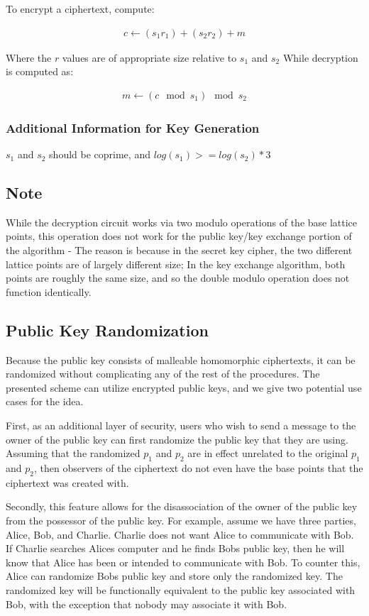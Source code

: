 \documentclass[preprint]{iacrtrans}
\begin{document}
To encrypt a ciphertext, compute:

\begin{align}
   c \gets (s_1 r_1) + (s_2 r_2) + m
\end{align}

Where the $r$ values are of appropriate size relative to $s_1$ and $s_2$ 
While decryption is computed as:

\begin{align}
    m \gets (c \mod s_1) \mod s_2
\end{align}

\subsubsection{Additional Information for Key Generation}
$s_1$ and $s_2$ should be coprime, and $log(s_1) >= log(s_2) * 3$

\subsection{Note}
While the decryption circuit works via two modulo operations of the base lattice points, this operation does not work for the public key/key exchange portion of the algorithm - The reason is because in the secret key cipher, the two different lattice points are of largely different size; In the key exchange algorithm, both points are roughly the same size, and so the double modulo operation does not function identically.

\subsection{Public Key Randomization}
Because the public key consists of malleable homomorphic ciphertexts, it can be randomized without complicating any of the rest of the procedures. The presented scheme can utilize encrypted public keys, and we give two potential use cases for the idea.

First, as an additional layer of security, users who wish to send a message to the owner of the public key can first randomize the public key that they are using. Assuming that the randomized $p_1$ and $p_2$ are in effect unrelated to the original $p_1$ and $p_2$, then observers of the ciphertext do not even have the base points that the ciphertext was created with.

Secondly, this feature allows for the disassociation of the owner of the public key from the possessor of the public key. For example, assume we have three parties, Alice, Bob, and Charlie. Charlie does not want Alice to communicate with Bob. If Charlie searches Alices computer and he finds Bobs public key, then he will know that Alice has been or intended to communicate with Bob. To counter this, Alice can randomize Bobs public key and store only the randomized key. The randomized key will be functionally equivalent to the public key associated with Bob, with the exception that nobody may associate it with Bob. 
\end{document}

